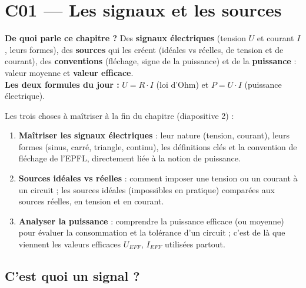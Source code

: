 \chapter{C01 --- Les signaux et les sources}

\begin{rembox}[title=En bref]
\textbf{De quoi parle ce chapitre ?} Des \textbf{signaux électriques} (tension $U$ et courant
$I$, leurs formes), des \textbf{sources} qui les créent (idéales vs réelles, de tension et de
courant), des \textbf{conventions} (fléchage, signe de la puissance) et de la
\textbf{puissance} : valeur moyenne et \textbf{valeur efficace}. \\
\textbf{Les deux formules du jour :} $U = R\cdot I$ (loi d'Ohm) et $P = U\cdot I$
(puissance électrique).
\end{rembox}

Les trois choses à maîtriser à la fin du chapitre (diapositive 2) :
\begin{enumerate}
  \item \textbf{Maîtriser les signaux électriques} : leur nature (tension, courant), leurs
        formes (sinus, carré, triangle, continu), les définitions clés et la convention de
        fléchage de l'EPFL, directement liée à la notion de puissance.
  \item \textbf{Sources idéales vs réelles} : comment imposer une tension ou un courant à un
        circuit ; les sources \og idéales\fg{} (impossibles en pratique) comparées aux sources
        \og réelles\fg{}, en tension et en courant.
  \item \textbf{Analyser la puissance} : comprendre la puissance efficace (ou moyenne) pour
        évaluer la consommation et la tolérance d'un circuit ; c'est de là que viennent les
        valeurs efficaces $U_{EFF}$, $I_{EFF}$ utilisées partout.
\end{enumerate}

\section{C'est quoi un signal ?}


